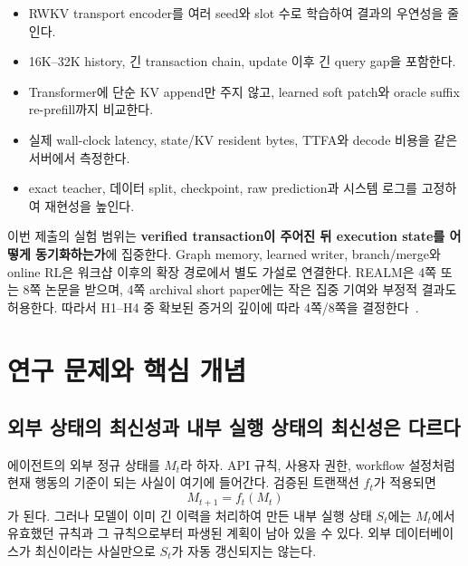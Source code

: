 \documentclass[10.5pt,a4paper]{article}
\begin{document}
\begin{itemize}
\item RWKV transport encoder를 여러 seed와 slot 수로 학습하여 결과의 우연성을 줄인다.
\item 16K--32K history, 긴 transaction chain, update 이후 긴 query gap을 포함한다.
\item Transformer에 단순 KV append만 주지 않고, learned soft patch와 oracle suffix re-prefill까지 비교한다.
\item 실제 wall-clock latency, state/KV resident bytes, TTFA와 decode 비용을 같은 서버에서 측정한다.
\item exact teacher, 데이터 split, checkpoint, raw prediction과 시스템 로그를 고정하여 재현성을 높인다.
\end{itemize}

이번 제출의 실험 범위는 \textbf{verified transaction이 주어진 뒤 execution state를 어떻게 동기화하는가}에 집중한다. Graph memory, learned writer, branch/merge와 online RL은 워크샵 이후의 확장 경로에서 별도 가설로 연결한다. REALM은 4쪽 또는 8쪽 논문을 받으며, 4쪽 archival short paper에는 작은 집중 기여와 부정적 결과도 허용한다. 따라서 H1--H4 중 확보된 증거의 깊이에 따라 4쪽/8쪽을 결정한다~\citep{realm2026}.

\section{연구 문제와 핵심 개념}

\subsection{외부 상태의 최신성과 내부 실행 상태의 최신성은 다르다}

에이전트의 외부 정규 상태를 $M_t$라 하자. API 규칙, 사용자 권한, workflow 설정처럼 현재 행동의 기준이 되는 사실이 여기에 들어간다. 검증된 트랜잭션 $f_t$가 적용되면
\begin{equation}
M_{t+1}=f_t(M_t)
\end{equation}
가 된다. 그러나 모델이 이미 긴 이력을 처리하여 만든 내부 실행 상태 $S_t$에는 $M_t$에서 유효했던 규칙과 그 규칙으로부터 파생된 계획이 남아 있을 수 있다. 외부 데이터베이스가 최신이라는 사실만으로 $S_t$가 자동 갱신되지는 않는다.
\end{document}
